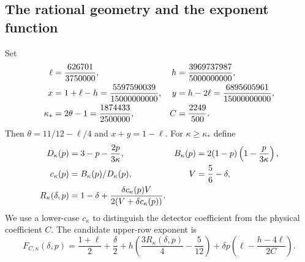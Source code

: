 \documentclass[11pt]{article}
\theoremstyle{definition}
\begin{document}
\subsection{The rational geometry and the exponent function}
Set
\begin{align}\label{eq:geometry}
 \ell&=\frac{626701}{3750000}, &
 h&=\frac{3969737987}{5000000000},\notag\\
 x&=1+\ell-h=\frac{5597590039}{15000000000}, &
 y&=h-2\ell=\frac{6895605961}{15000000000},\notag\\
 \kappa_*&=2\theta-1=\frac{1874433}{2500000}, &
 C&=\frac{2249}{500}.
\end{align}
Then $\theta=11/12-\ell/4$ and $x+y=1-\ell$.
For $\kappa\ge\kappa_*$ define
\begin{align}\label{eq:detector}
 D_\kappa(p)&=3-p-\frac{2p}{3\kappa}, &
 B_\kappa(p)&=2(1-p)\left(1-\frac{p}{3\kappa}\right),\notag\\
 c_\kappa(p)&=B_\kappa(p)/D_\kappa(p), &
 V&=\frac56-\delta,\notag\\
 R_\kappa(\delta,p)&=1-\delta+
       \frac{\delta c_\kappa(p)V}{2(V+\delta c_\kappa(p))}.
\end{align}
We use a lower-case $c_\kappa$ to distinguish the detector coefficient
from the physical coefficient $C$. The candidate upper-row exponent is
\begin{equation}\label{eq:F}
 F_{C,\kappa}(\delta,p)=\frac{1+\ell}{2}+\frac\delta2
 +h\left(\frac{3R_\kappa(\delta,p)}4-\frac5{12}\right)
 +\delta p\left(\ell-\frac{h-4\ell}{2C}\right).
\end{equation}
\end{document}
